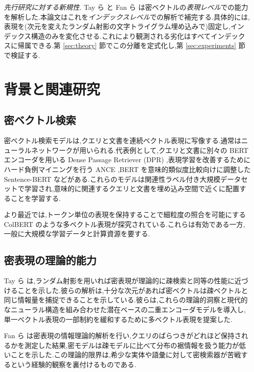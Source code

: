 \documentclass[conference]{IEEEtran}
\begin{document}
\noindent\textit{先行研究に対する新規性.} Tay ら \cite{tay2020sparse} と Fan ら \cite{fan2022information} は密ベクトルの\emph{表現レベル}での能力を解析した.本論文はこれを\emph{インデックスレベル}での解析で補完する.具体的には,表現を(次元を変えたランダム射影の文字トライグラム埋め込みで)固定し,インデックス構造のみを変化させる.これにより観測される劣化はすべてインデックスに帰属できる.第 \ref{sec:theory} 節でこの分離を定式化し,第 \ref{sec:experiments} 節で検証する.

\section{背景と関連研究}

\subsection{密ベクトル検索}
密ベクトル検索モデルは,クエリと文書を連続ベクトル表現に写像する.通常はニューラルネットワークが用いられる.代表例として,クエリと文書に別々の BERT エンコーダを用いる Dense Passage Retriever (DPR) \cite{karpukhin2020dense},表現学習を改善するためにハード負例マイニングを行う ANCE \cite{xiong2021approximate},BERT を意味的類似度比較向けに調整した Sentence-BERT \cite{reimers2019sentencebert} などがある.これらのモデルは関連性ラベル付き大規模データセットで学習され,意味的に関連するクエリと文書を埋め込み空間で近くに配置することを学習する.

より最近では,トークン単位の表現を保持することで細粒度の照合を可能にする ColBERT \cite{khattab2020colbert} のような多ベクトル表現が探究されている.これらは有効である一方,一般に大規模な学習データと計算資源を要する.

\subsection{密表現の理論的能力}
Tay ら \cite{tay2020sparse} は,ランダム射影を用いれば密表現が理論的に疎検索と同等の性能に近づけることを示した.彼らの解析は,十分な次元があれば密ベクトルは疎ベクトルと同じ情報量を捕捉できることを示している.彼らは,これらの理論的洞察と現代的なニューラル構造を組み合わせた潜在ベースの二重エンコーダモデルを導入し,単一ベクトル表現の一部制約を緩和するために多ベクトル表現を提案した.

Fan ら \cite{fan2022information} は密表現の情報理論的解析を行い,クエリのばらつきがどれほど保持されるかを測定した結果,密モデルは疎モデルに比べて分布の裾情報を扱う能力が低いことを示した.この理論的限界は,希少な実体や語彙に対して密検索器が苦戦するという経験的観察を裏付けるものである.
\end{document}
